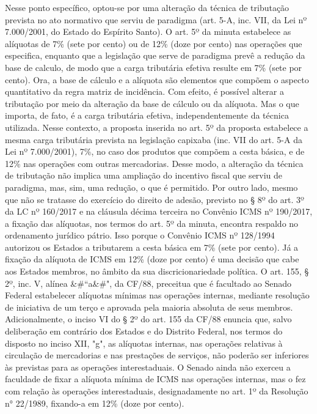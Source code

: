 \documentclass[10pt]{article}
\begin{document}
Nesse ponto específico, optou-se por uma alteração da técnica de tributação prevista no ato normativo que serviu de paradigma (art. 5-A, inc. VII, da Lei nº 7.000/2001, do Estado do Espírito Santo). O art. 5º da minuta estabelece as alíquotas de 7\% (sete por cento) ou de 12\% (doze por cento) nas operações que especifica, enquanto que a legislação que serve de paradigma prevê a redução da base de calculo, de modo que a carga tributária efetiva resulte em 7\% (sete por cento). 
Ora, a base de cálculo e a alíquota são elementos que compõem o aspecto quantitativo da regra matriz de incidência. Com efeito, é possível alterar a tributação por meio da alteração da base de cálculo ou da alíquota. Mas o que importa, de fato, é a carga tributária efetiva, independentemente da técnica utilizada. 
Nesse contexto, a proposta inserida no art. 5º da proposta estabelece a mesma carga tributária prevista na legislação capixaba (inc. VII do art. 5-A da Lei nº 7.000/2001), 7\%, no caso dos produtos que compõem a cesta básica, e de 12\% nas operações com outras mercadorias. 
Desse modo, a alteração da técnica de tributação não implica uma ampliação do incentivo fiscal que serviu de paradigma, mas, sim, uma redução, o que é permitido. 
Por outro lado, mesmo que não se tratasse do exercício do direito de adesão, previsto no § 8º do art. 3º da LC nº 160/2017 e na cláusula décima terceira no Convênio ICMS nº 190/2017, a fixação das alíquotas, nos termos do art. 5º da minuta, encontra respaldo no ordenamento jurídico pátrio.
Isso porque o Convênio ICMS nº 128/1994 autorizou os Estados a tributarem a cesta básica em 7\% (sete por cento). Já a fixação da alíquota de ICMS em 12\% (doze por cento) é uma decisão que cabe aos Estados membros, no âmbito da sua discricionariedade política. 
O art. 155, § 2º, inc. V, alínea &#``a&#", da CF/88, preceitua que é facultado ao Senado Federal estabelecer alíquotas mínimas nas operações internas, mediante resolução de iniciativa de um terço e aprovada pela maioria absoluta de seus membros. Adicionalmente, o inciso VI do § 2º do art. 155 da CF/88 enuncia que, salvo deliberação em contrário dos Estados e do Distrito Federal, nos termos do disposto no inciso XII, "g", as alíquotas internas, nas operações relativas à circulação de mercadorias e nas prestações de serviços, não poderão ser inferiores às previstas para as operações interestaduais.
O Senado ainda não exerceu a faculdade de fixar a alíquota mínima de ICMS nas operações internas, mas o fez com relação às operações interestaduais, designadamente no art. 1º da Resolução n° 22/1989, fixando-a em 12\% (doze por cento).
\end{document}
